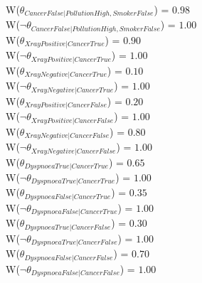 W($\theta_{CancerFalse|PollutionHigh,SmokerFalse}$) = $0.98$\\ 
W($\neg\theta_{CancerFalse|PollutionHigh,SmokerFalse}$) = $1.00$\\ 
W($\theta_{XrayPositive|CancerTrue}$) = $0.90$\\ 
W($\neg\theta_{XrayPositive|CancerTrue}$) = $1.00$\\ 
W($\theta_{XrayNegative|CancerTrue}$) = $0.10$\\ 
W($\neg\theta_{XrayNegative|CancerTrue}$) = $1.00$\\ 
W($\theta_{XrayPositive|CancerFalse}$) = $0.20$\\ 
W($\neg\theta_{XrayPositive|CancerFalse}$) = $1.00$\\ 
W($\theta_{XrayNegative|CancerFalse}$) = $0.80$\\ 
W($\neg\theta_{XrayNegative|CancerFalse}$) = $1.00$\\ 
W($\theta_{DyspnoeaTrue|CancerTrue}$) = $0.65$\\ 
W($\neg\theta_{DyspnoeaTrue|CancerTrue}$) = $1.00$\\ 
W($\theta_{DyspnoeaFalse|CancerTrue}$) = $0.35$\\ 
W($\neg\theta_{DyspnoeaFalse|CancerTrue}$) = $1.00$\\ 
W($\theta_{DyspnoeaTrue|CancerFalse}$) = $0.30$\\ 
W($\neg\theta_{DyspnoeaTrue|CancerFalse}$) = $1.00$\\ 
W($\theta_{DyspnoeaFalse|CancerFalse}$) = $0.70$\\ 
W($\neg\theta_{DyspnoeaFalse|CancerFalse}$) = $1.00$\\ 
